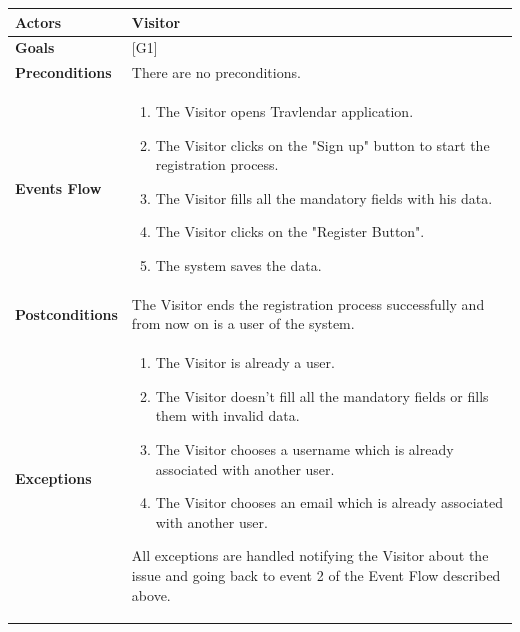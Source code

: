 \documentclass[12pt]{article}
\begin{document}
\begin{center}
    \begin{tabular} { |p{}|p{}| }
        \hline
        \textbf{Actors} & Visitor \\ 
        \hline
        \textbf{Goals} & {[G1]} \\ 
        \hline  
        \textbf{Preconditions} & There are no preconditions. \\ 
        \hline
        \textbf{Events Flow} & \begin{enumerate} 
                            \setlength{\itemsep}{0.5pt}
                            \item The Visitor opens Travlendar application.
                            \item The Visitor clicks on the "Sign up" button to start the registration process. 
                            \item The Visitor fills all the mandatory fields with his data. 
                            \item The Visitor clicks on the "Register Button".
                            \item The system saves the data.
                            \end{enumerate} \\
        \hline
        \textbf{Postconditions} & The Visitor ends the registration process successfully and from now on is a user of the system. \\
        \hline
        \textbf{Exceptions} & \begin{enumerate} 
                            \setlength{\itemsep}{0.5pt}
                            \item The Visitor is already a user. 
                            \item The Visitor doesn't fill all the mandatory fields or fills them with invalid data.
                            \item The Visitor chooses a username which is already associated with another user.
                            \item The Visitor chooses an email which is already associated with another user. 
                            \end{enumerate} 
                            All exceptions are handled notifying the Visitor about the issue and going back to event 2 of the Event Flow described above.\\ 
        \hline
    \end{tabular}
\end{center}
\end{document}
